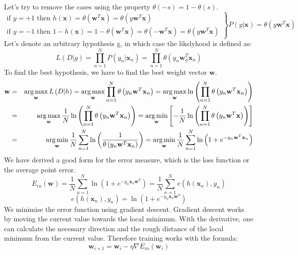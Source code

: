 Let's try to remove the cases using the property $\theta(-s) = 1 - \theta (s)$.
\[\left.
\begin{array}{l}
\mbox{if $y=+1$ then } h(\mathbf{x}) = \theta (\mathbf{w}^T \mathbf{x}) = \theta (y \mathbf{w}^T \mathbf{x}) \\
\mbox{if $y=-1$ then } 1 - h(\mathbf{x}) = 1 - \theta (\mathbf{w}^T \mathbf{x}) = \theta (-\mathbf{w}^T \mathbf{x}) = \theta (y \mathbf{w}^T \mathbf{x})
\end{array}
\right\} P(y | \mathbf{x}) = \theta(y \mathbf{w}^T \mathbf{x})\]
Let's denote an arbitrary hypothesis g, in which case the likelyhood is defined as:
\[L(D|g) = \prod_{n=1}^N P(y_n | \mathbf{x}_n) = \prod_{n=1}^N \theta(y_n \mathbf{w}_g^T \mathbf{x}_n)\]
To find the best hypothesis, we have to find the best weight vector $\mathbf{w}$.
\begin{eqnarray*}
\mathbf{w} & = & \operatorname*{arg\,max}_\mathbf{w} L \left( D|h \right) = \operatorname*{arg\,max}_\mathbf{w} \prod_{n=1}^N  \theta \left( y_n \mathbf{w}^T \mathbf{x}_n \right) = \operatorname*{arg\,max}_\mathbf{w} \ln \left( \prod_{n=1}^N \theta\left( y_n \mathbf{w}^T \mathbf{x}_n \right) \right) \\
& = & \operatorname*{arg\,max}_\mathbf{w} \frac{1}{N} \ln \left( \prod_{n=1}^N \theta \left( y_n \mathbf{w}^T \mathbf{x}_n \right) \right) = \operatorname*{arg\,min}_\mathbf{w} \left[ - \frac{1}{N} \ln \left( \prod_{n=1}^N \theta \left( y_n \mathbf{w}^T \mathbf{x} \right) \right) \right] \\
& = & \operatorname*{arg\,min}_\mathbf{w} \frac{1}{N} \sum_{n=1}^N \ln \left( \frac{1}{\theta \left( y_n \mathbf{w}^T \mathbf{x}_n \right)} \right) = \operatorname*{arg\,min}_\mathbf{w} \frac{1}{N} \sum_{n=1}^N \ln \left( 1 + e^{-y_n \mathbf{w}^T \mathbf{x}_n} \right)
\end{eqnarray*}
We have derived a good form for the error measure, which is the loss function or the average point error.
\[ E_{in} \left( \mathbf{w} \right) = \frac{1}{N} \sum_{n=1}^N \ln \left( 1 + e^{-y_n \mathbf{x}_n \mathbf{w}^T} \right) = \frac{1}{N} \sum_{n=1}^N e \left( h \left( \mathbf{x}_n \right), y_n \right) \]
\[ e \left( h \left( \mathbf{x}_n \right), y_n \right) = \ln \left( 1 + e^{-y_n \mathbf{x}_n \mathbf{w}^T} \right) \]
We minimise the error function using gradient descent. Gradient descent works by moving the current value towards the local minimum. With the derivative, one can calculate the necessary direction and the rough distance of the local minimum from the current value. Therefore training works with the formula:
\[ \mathbf{w}_{i+1} = \mathbf{w}_i - \eta \nabla E_{in} \left( \mathbf{w}_i \right) \]
